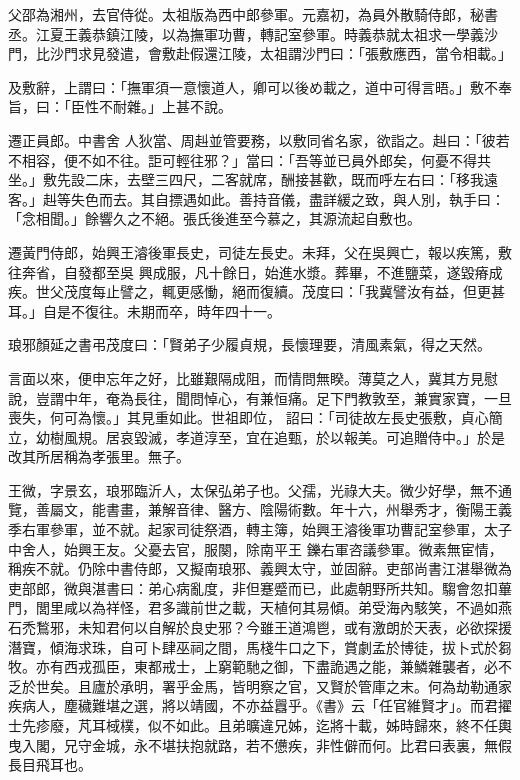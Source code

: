 \begin{pinyinscope}
 父邵為湘州，去官侍從。太祖版為西中郎參軍。元嘉初，為員外散騎侍郎，秘書丞。江夏王義恭鎮江陵，以為撫軍功曹，轉記室參軍。時義恭就太祖求一學義沙門，比沙門求見發遣，會敷赴假還江陵，太祖謂沙門曰：「張敷應西，當令相載。」



 及敷辭，上謂曰：「撫軍須一意懷道人，卿可以後め載之，道中可得言晤。」敷不奉旨，曰：「臣性不耐雜。」上甚不說。



 遷正員郎。中書舍
 人狄當、周赳並管要務，以敷同省名家，欲詣之。赳曰：「彼若不相容，便不如不往。詎可輕往邪？」當曰：「吾等並已員外郎矣，何憂不得共坐。」敷先設二床，去壁三四尺，二客就席，酬接甚歡，既而呼左右曰：「移我遠客。」赳等失色而去。其自摽遇如此。善持音儀，盡詳緩之致，與人別，執手曰：「念相聞。」餘響久之不絕。張氏後進至今慕之，其源流起自敷也。



 遷黃門侍郎，始興王濬後軍長史，司徒左長史。未拜，父在吳興亡，報以疾篤，敷往奔省，自發都至吳
 興成服，凡十餘日，始進水漿。葬畢，不進鹽菜，遂毀瘠成疾。世父茂度每止譬之，輒更感慟，絕而復續。茂度曰：「我冀譬汝有益，但更甚耳。」自是不復往。未期而卒，時年四十一。



 琅邪顏延之書弔茂度曰：「賢弟子少履貞規，長懷理要，清風素氣，得之天然。



 言面以來，便申忘年之好，比雖艱隔成阻，而情問無睽。薄莫之人，冀其方見慰說，豈謂中年，奄為長往，聞問悼心，有兼恒痛。足下門教敦至，兼實家寶，一旦喪失，何可為懷。」其見重如此。世祖即位，
 詔曰：「司徒故左長史張敷，貞心簡立，幼樹風規。居哀毀滅，孝道淳至，宜在追甄，於以報美。可追贈侍中。」於是改其所居稱為孝張里。無子。



 王微，字景玄，琅邪臨沂人，太保弘弟子也。父孺，光祿大夫。微少好學，無不通覽，善屬文，能書畫，兼解音律、醫方、陰陽術數。年十六，州舉秀才，衡陽王義季右軍參軍，並不就。起家司徒祭酒，轉主簿，始興王濬後軍功曹記室參軍，太子中舍人，始興王友。父憂去官，服闋，除南平王
 鑠右軍咨議參軍。微素無宦情，稱疾不就。仍除中書侍郎，又擬南琅邪、義興太守，並固辭。吏部尚書江湛舉微為吏部郎，微與湛書曰：弟心病亂度，非但蹇蹙而已，此處朝野所共知。騶會忽扣蓽門，閭里咸以為祥怪，君多識前世之載，天植何其易傾。弟受海內駭笑，不過如燕石禿鶖邪，未知君何以自解於良史邪？今雖王道鴻鬯，或有激朗於天表，必欲探援潛寶，傾海求珠，自可卜肆巫祠之間，馬棧牛口之下，賞劇孟於博徒，拔卜式於芻
 牧。亦有西戎孤臣，東都戒士，上窮範馳之御，下盡詭遇之能，兼鱗雜襲者，必不乏於世矣。且廬於承明，署乎金馬，皆明察之官，又賢於管庫之末。何為劫勒通家疾病人，塵穢難堪之選，將以靖國，不亦益囂乎。《書》云「任官維賢才」。而君擢士先疹廢，芃耳棫樸，似不如此。且弟曠違兄姊，迄將十載，姊時歸來，終不任輿曳入閣，兄守金城，永不堪扶抱就路，若不憊疾，非性僻而何。比君曰表裏，無假長目飛耳也。




\end{pinyinscope}

